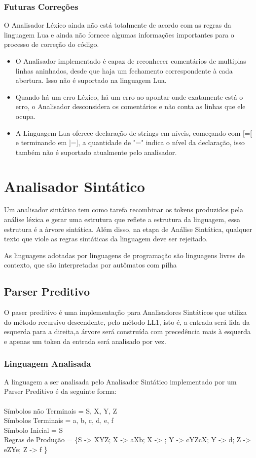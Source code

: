 \documentclass[12pt,a4paper,twoside]{report}
\begin{document}
\subsection{Futuras Correções}

O Analisador Léxico ainda não está totalmente de acordo com as regras da linguagem Lua e ainda não fornece algumas informações importantes para o processo de correção do código.

\begin{itemize}
\item O Analisador implementado é capaz de reconhecer comentários de multiplas linhas aninhados, desde que haja um fechamento correspondente à cada abertura. Isso não é suportado na linguagem Lua.
\item Quando há um erro Léxico, há um erro ao apontar onde exatamente está o erro, o Analisador desconsidera os comentários e não conta as linhas que ele ocupa.
\item A Linguagem Lua oferece declaração de strings em níveis, começando com [=[ e terminando em ]=], a quantidade de "=" indica o nível da declaração, isso também não é suportado atualmente pelo analisador.
\end{itemize}

\chapter{Analisador Sintático}

Um analisador sintático tem como tarefa recombinar os tokens produzidos pela análise léxica e gerar uma estrutura que reflete a estrutura da linguagem, essa estrutura é a àrvore sintática. Além disso, na etapa de Análise Sintática, qualquer texto que viole as regras sintáticas da linguagem deve ser rejeitado.

As linguagens adotadas por linguagens de programação são linguagens livres de contexto, que são interpretadas por autômatos com pilha

\section{Parser Preditivo}
O paser preditivo é uma implementação para Analisadores Sintáticos que utiliza do método recursivo descendente, pelo método LL1, isto é, a entrada será lida da esquerda para a direita,a  árvore será construída com precedência mais à esquerda e apenas um token da entrada será analisado por vez.
\subsection{Linguagem Analisada}
A linguagem a ser analisada pelo Analisador Sintático implementado por um Parser Preditivo é da seguinte forma:\\
\\
Símbolos não Terminais = {S, X, Y, Z} \\
Símbolos Terminais = {a, b, c, d, e, f} \\
Símbolo Inicial = S \\
Regras de Produção = \{S -> XYZ; X -> aXb; X -> ; Y -> cYZcX; Y -> d; Z -> eZYe; Z -> f \} \\
\end{document}
